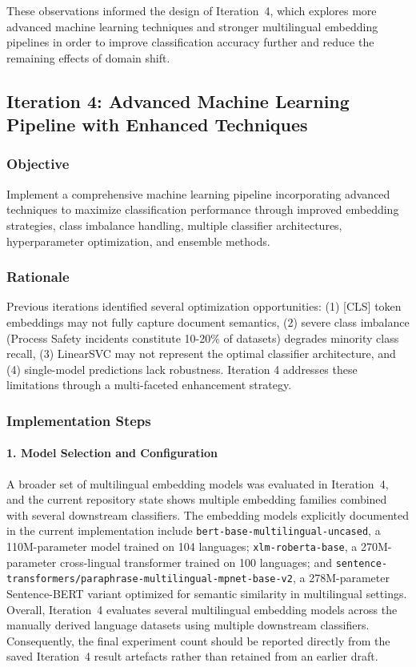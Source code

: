\documentclass[11pt, titlepage, bibliography=totoc]{scrreprt}
\begin{document}
These observations informed the design of Iteration~4, which explores more advanced machine learning techniques and stronger multilingual embedding pipelines in order to improve classification accuracy further and reduce the remaining effects of domain shift.


\subsection{Iteration 4: Advanced Machine Learning Pipeline with Enhanced Techniques}

\subsubsection{Objective}
Implement a comprehensive machine learning pipeline incorporating advanced techniques to maximize classification performance through improved embedding strategies, class imbalance handling, multiple classifier architectures, hyperparameter optimization, and ensemble methods.

\subsubsection{Rationale}
Previous iterations identified several optimization opportunities: (1) [CLS] token embeddings may not fully capture document semantics, (2) severe class imbalance (Process Safety incidents constitute 10-20\% of datasets) degrades minority class recall, (3) LinearSVC may not represent the optimal classifier architecture, and (4) single-model predictions lack robustness. Iteration 4 addresses these limitations through a multi-faceted enhancement strategy.

\subsubsection{Implementation Steps}

\paragraph{1. Model Selection and Configuration}
A broader set of multilingual embedding models was evaluated in Iteration~4, and the current repository state shows multiple embedding families combined with several downstream classifiers. The embedding models explicitly documented in the current implementation include \texttt{bert-base-multilingual-uncased}, a 110M-parameter model trained on 104 languages; \texttt{xlm-roberta-base}, a 270M-parameter cross-lingual transformer trained on 100 languages; and \texttt{sentence-transformers/paraphrase-multilingual-mpnet-base-v2}, a 278M-parameter Sentence-BERT variant optimized for semantic similarity in multilingual settings. Overall, Iteration~4 evaluates several multilingual embedding models across the manually derived language datasets using multiple downstream classifiers. Consequently, the final experiment count should be reported directly from the saved Iteration~4 result artefacts rather than retained from an earlier draft.
\end{document}
